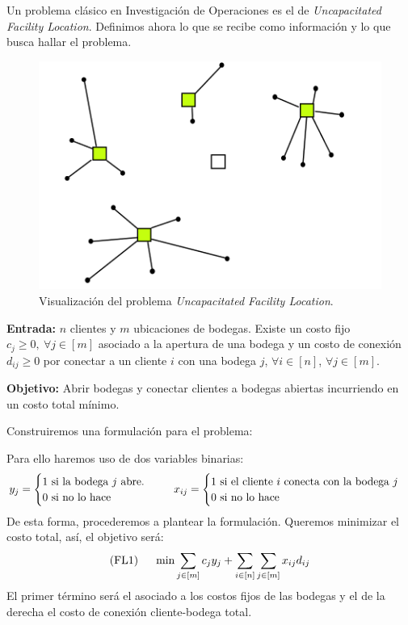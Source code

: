 \begin{eje} Un problema clásico en Investigación de Operaciones es el de \emph{Uncapacitated Facility Location}. Definimos ahora lo que se recibe como información y lo que busca hallar el problema.

\begin{figure}[H]
    \centering
    \includegraphics[scale=0.25]{UFL.png}
    \caption{Visualización del problema \textit{Uncapacitated Facility Location}.}
    \label{fig:UFL}
\end{figure}

\textbf{Entrada:} $n$ clientes y $m$ ubicaciones de bodegas. Existe un costo fijo $c_j\geq 0,\ \forall j\in [m]$ asociado a la apertura de una bodega y un costo de conexión $d_{ij}\geq 0$ por conectar a un cliente $i$ con una bodega $j$, $\forall i\in[n]$, $\forall j\in[m]$.

\textbf{Objetivo:} Abrir bodegas y conectar clientes a bodegas abiertas incurriendo en un costo total mínimo.

Construiremos una formulación para el problema:

Para ello haremos uso de dos variables binarias:
$$y_j=\begin{cases}1\text{ si la bodega }j\text{ abre.}\\
0\text{ si no lo hace}\end{cases}\hspace{0.5cm}x_{ij}=\begin{cases}1\text{ si el cliente } i\text{ conecta con la bodega }j\\
0\text{ si no lo hace}
\end{cases}$$
De esta forma, procederemos a plantear la formulación. Queremos minimizar el costo total, así, el objetivo será:
$$\text{(FL1)}\hspace{0.5cm}\min \sum_{j\in[m]}c_j y_j + \sum_{i\in [n]}\sum_{j\in[m]}x_{ij}d_{ij}$$
El primer término será el asociado a los costos fijos de las bodegas y el de la derecha el costo de conexión cliente-bodega total.


\end{eje}
